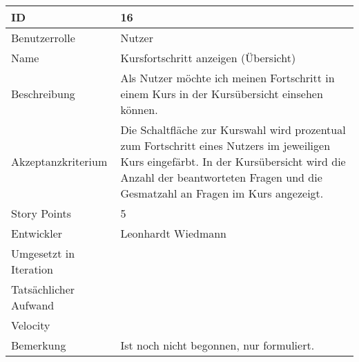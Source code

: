 \begin{tabularx}{\textwidth}{|p{}|X|}
	\hline
	ID & 16\\
	\hline
	Benutzerrolle & Nutzer\\
	\hline
	Name & Kursfortschritt anzeigen (Übersicht)\\
	\hline
	Beschreibung & Als Nutzer möchte ich meinen Fortschritt in einem Kurs in der Kursübersicht einsehen können.\\
	\hline
	Akzeptanzkriterium & Die Schaltfläche zur Kurswahl wird prozentual zum Fortschritt eines Nutzers im jeweiligen Kurs eingefärbt. In der Kursübersicht wird die Anzahl der beantworteten Fragen und die Gesmatzahl an Fragen im Kurs angezeigt.\\
	\hline
	Story Points & 5\\
	\hline
	Entwickler & Leonhardt Wiedmann\\
	\hline
	Umgesetzt in Iteration & \\ 
	\hline
	Tatsächlicher Aufwand & \\
	\hline
	Velocity & \\
	\hline
	Bemerkung & Ist noch nicht begonnen, nur formuliert.\\
	\hline
\end{tabularx}
\vspace{20pt}
